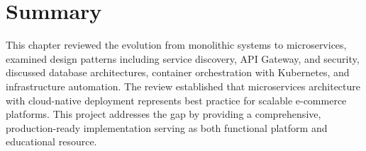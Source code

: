 \section{Summary}

This chapter reviewed the evolution from monolithic systems to microservices, examined design patterns including service discovery, API Gateway, and security, discussed database architectures, container orchestration with Kubernetes, and infrastructure automation. The review established that microservices architecture with cloud-native deployment represents best practice for scalable e-commerce platforms. This project addresses the gap by providing a comprehensive, production-ready implementation serving as both functional platform and educational resource.
